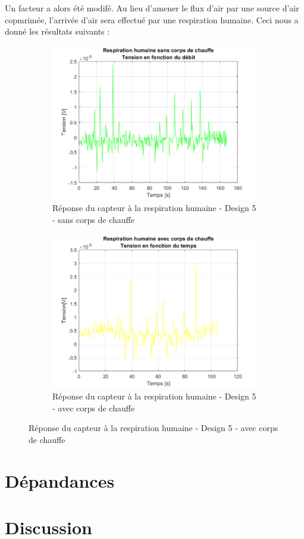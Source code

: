 Un facteur a alors été modifé. Au lieu d'amener le flux d'air par une source d'air copmrimée, l'arrivée d'air sera effectué par une respiration humaine. Ceci nous a donné les résultats suivants :
\begin{figure}[H]
    \centering
    \begin{subfigure}[b]{0.45\textwidth}
        \includegraphics[scale = 0.43]{assets/figures/humanBreath_green_sansCorpsDeChauffe.png}
        \caption{Réponse du capteur à la respiration humaine - Design 5 - sans corps de chauffe}
        \label{fig:human_breath_green_without_heat}
    \end{subfigure}
    \begin{subfigure}[b]{0.45\textwidth}
        \includegraphics[scale = 0.43]{assets/figures/humanBreath_green_avecCorpsDeChauffe.png}
        \caption{Réponse du capteur à la respiration humaine - Design 5 - avec corps de chauffe}
        \label{fig:human_breath_green_with_heat}
    \end{subfigure}
\end{figure}

\section{Dépandances}
\section{Discussion}